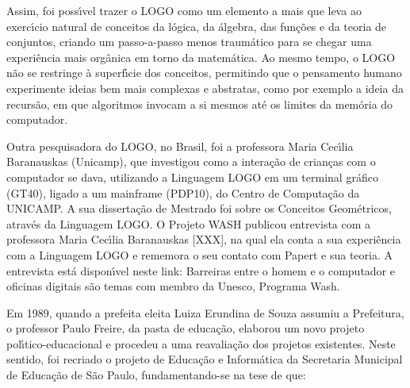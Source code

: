 \documentclass[
12pt,		%
openright,	%
twoside,  %
a4paper,			%
chapter=TITLE,		%
english,			%
french,				%
spanish,			%
brazil				%
]{USPSC-classe/USPSC_RedarTex}
\begin{document}
Assim, foi poss\'{\i}vel trazer o LOGO como um elemento a mais que leva ao exerc\'{\i}cio natural de conceitos da l\'ogica, da \'algebra, das fun\c{c}\~oes e da teoria de conjuntos, criando um passo-a-passo menos traum\'atico para se chegar uma experi\^encia mais org\^anica em torno da matem\'atica. Ao mesmo tempo, o LOGO n\~ao se restringe \`a superf\'{\i}cie dos conceitos, permitindo que o pensamento humano experimente ideias bem mais complexas e abstratas, como por exemplo a ideia da recurs\~ao, em que algoritmos invocam a si mesmos at\'e os limites da mem\'oria do computador.










Outra pesquisadora do LOGO, no Brasil, foi a professora Maria Cec\'{\i}lia Baranauskas (Unicamp), que investigou como a intera\c{c}\~ao de crian\c{c}as com o computador se dava, utilizando a Linguagem LOGO em um terminal gr\'afico (GT40), ligado a um mainframe (PDP10), do Centro de Computa\c{c}\~ao da UNICAMP. A sua disserta\c{c}\~ao de Mestrado foi sobre os \textquotedbl Conceitos Geom\'etricos, atrav\'es da Linguagem LOGO\textquotedbl . O Projeto WASH publicou entrevista com a professora Maria Cec\'{\i}lia Baranauskas [XXX], na qual ela conta a sua experi\^encia com a Linguagem LOGO e rememora o seu contato com Papert e sua teoria. A entrevista est\'a dispon\'{\i}vel neste link: \textquotedbl Barreiras entre o homem e o computador e oficinas digitais s\~ao temas com membro da Unesco, Programa Wash\textquotedbl .










Em 1989, quando a prefeita eleita Luiza Erundina de Souza assumiu a Prefeitura, o professor Paulo Freire, da pasta de educa\c{c}\~ao, elaborou um novo projeto pol\'{\i}tico-educacional e procedeu a uma reavalia\c{c}\~ao dos projetos existentes. Neste sentido, foi recriado o projeto de Educa\c{c}\~ao e Inform\'atica da Secretaria Municipal de Educa\c{c}\~ao de S\~ao Paulo, fundamentando-se na tese de que:











\noindent\begin{center}\mbox{\centering{}}\end{center}
\end{document}
